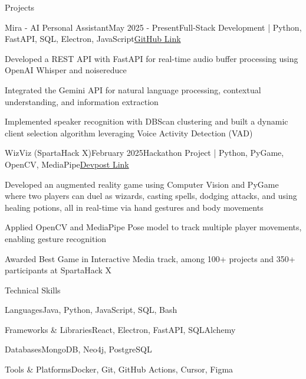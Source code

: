 \documentclass[
	11pt
]{resume}
\begin{document}
	\begin{rSection}{P}{rojects}
		\begin{rSectionEntry}{Mira - AI Personal Assistant}{May 2025 - Present}{Full-Stack Development | Python, FastAPI, SQL, Electron, JavaScript}{\href{https://github.com/mira-assistant}{GitHub Link}}
			\item Developed a REST API with FastAPI for real-time audio buffer processing using OpenAI Whisper and noisereduce
  			\item Integrated the Gemini API for natural language processing, contextual understanding, and information extraction
			\item Implemented speaker recognition with DBScan clustering and built a dynamic client selection algorithm leveraging Voice Activity Detection (VAD)
		\end{rSectionEntry}

		\begin{rSectionEntry}{WizViz (SpartaHack X)}{February 2025}{Hackathon Project | Python, PyGame, OpenCV, MediaPipe}{\href{https://devpost.com/software/wizviz}{Devpost Link}}
			\item Developed an augmented reality game using Computer Vision and PyGame where two players can duel as wizards, casting spells, dodging attacks, and using healing potions, all in real-time via hand gestures and body movements
			\item Applied OpenCV and MediaPipe Pose model to track multiple player movements, enabling gesture recognition
			\item Awarded Best Game in Interactive Media track, among 100+ projects and 350+ participants at SpartaHack X
		\end{rSectionEntry}
	\end{rSection}

	\begin{rSection}{T}{echnical Skills}
		\begin{rSet}{Languages}{Java, Python, JavaScript, SQL, Bash}
		\end{rSet}
		\begin{rSet}{Frameworks \& Libraries}{React, Electron, FastAPI, SQLAlchemy}
		\end{rSet}
		\begin{rSet}{Databases}{MongoDB, Neo4j, PostgreSQL}
		\end{rSet}
		\begin{rSet}{Tools \& Platforms}{Docker, Git, GitHub Actions, Cursor, Figma}
		\end{rSet}
	\end{rSection}
\end{document}
